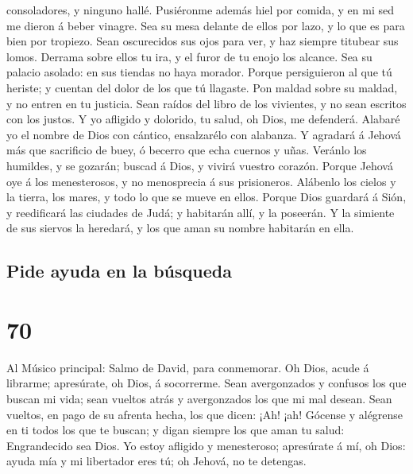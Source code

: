 consoladores, y ninguno hallé.  Pusiéronme además hiel
por comida, y en mi sed me dieron á beber vinagre.  Sea
su mesa delante de ellos por lazo, y lo que es para bien por tropiezo.
 Sean oscurecidos sus ojos para ver, y haz siempre
titubear sus lomos.  Derrama sobre ellos tu ira, y el
furor de tu enojo los alcance.  Sea su palacio asolado:
en sus tiendas no haya morador.  Porque persiguieron al
que tú heriste; y cuentan del dolor de los que tú llagaste.
 Pon maldad sobre su maldad, y no entren en tu justicia.
 Sean raídos del libro de los vivientes, y no sean
escritos con los justos.  Y yo afligido y dolorido, tu
salud, oh Dios, me defenderá.  Alabaré yo el nombre de
Dios con cántico, ensalzarélo con alabanza.  Y agradará á
Jehová más que sacrificio de buey, ó becerro que echa cuernos y uñas.
 Veránlo los humildes, y se gozarán; buscad á Dios, y
vivirá vuestro corazón.  Porque Jehová oye á los
menesterosos, y no menosprecia á sus prisioneros. 
Alábenlo los cielos y la tierra, los mares, y todo lo que se mueve en
ellos.  Porque Dios guardará á Sión, y reedificará las
ciudades de Judá; y habitarán allí, y la poseerán.  Y la
simiente de sus siervos la heredará, y los que aman su nombre habitarán
en ella.

\hypertarget{pide-ayuda-en-la-buxfasqueda}{%
\subsection{Pide ayuda en la
búsqueda}\label{pide-ayuda-en-la-buxfasqueda}}

\hypertarget{section-69}{%
\section{70}\label{section-69}}

 Al Músico principal: Salmo de David, para conmemorar. Oh
Dios, acude á librarme; apresúrate, oh Dios, á socorrerme.
 Sean avergonzados y confusos los que buscan mi vida; sean
vueltos atrás y avergonzados los que mi mal desean.  Sean
vueltos, en pago de su afrenta hecha, los que dicen: ¡Ah! ¡ah!
 Gócense y alégrense en ti todos los que te buscan; y
digan siempre los que aman tu salud: Engrandecido sea Dios.
 Yo estoy afligido y menesteroso; apresúrate á mí, oh
Dios: ayuda mía y mi libertador eres tú; oh Jehová, no te detengas.

